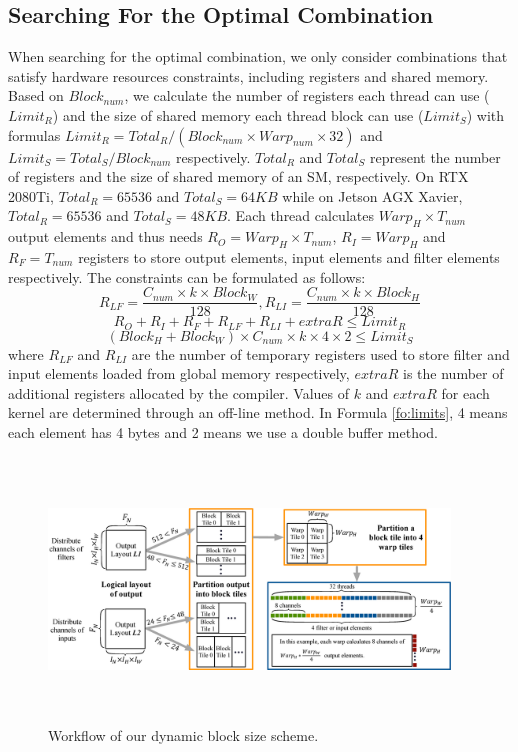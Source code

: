 \subsection{Searching For the Optimal Combination}
When searching for the optimal combination, we only consider combinations that satisfy hardware resources constraints, including registers and shared memory.
Based on $Block_{num}$, we calculate the number of registers each thread can use ($Limit_R$) and the size of shared memory each thread block can use ($Limit_S$) with formulas $Limit_R=Total_R/(Block_{num}\times Warp_{num} \times 32)$ and $Limit_S=Total_S/Block_{num}$ respectively. $Total_R$ and $Total_S$ represent the number of registers and the size of shared memory of an SM, respectively. On RTX 2080Ti, $Total_R=65536$ and $Total_S=64KB$ while  on Jetson AGX Xavier, $Total_R=65536$ and $Total_S=48KB$.
Each thread calculates $Warp_H \times T_{num}$ output elements and thus needs $R_O=Warp_H \times T_{num}$, $R_I=Warp_H$ and $R_F=T_{num}$ registers to store output elements, input elements and filter elements respectively.
The constraints can be formulated as follows:
\begin{equation}\nonumber
R_{LF}=\frac{C_{num} \times k \times Block_W}{128},R_{LI}=\frac{C_{num} \times k \times Block_H}{128}
\end{equation}
\begin{equation}
    \label{fo:limitr}
R_O+R_I+R_F+R_{LF}+R_{LI}+extraR \leq Limit_R
\end{equation}
\begin{equation}
    \label{fo:limits}
(Block_H+Block_W)\times C_{num} \times k \times 4 \times 2 \leq Limit_S
\end{equation}
where $R_{LF}$ and $R_{LI}$ are the number of temporary registers used to store filter and input elements loaded from global memory respectively, $extraR$ is the number of additional registers allocated by the compiler. Values of $k$ and $extraR$ for each kernel are determined through an off-line method. In Formula \ref{fo:limits}, 4 means each element has 4 bytes and 2 means we use a double buffer method.
\begin{figure}
	\centering
    \includegraphics[width=0.95\textwidth,height=7cm]{./figure/pwworkflow.eps}
    \caption{Workflow of our dynamic block size scheme.} \label{fig:pwworkflow}
\end{figure}
